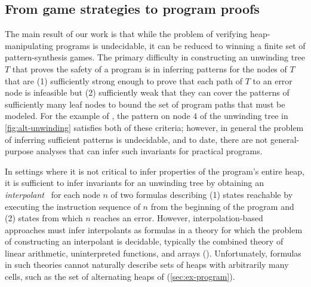 \subsection{From game strategies to program proofs}
\label{sec:ex-infer}
%
The main result of our work is that while the problem of verifying
heap-manipulating programs is undecidable, it can be reduced to
winning a finite set of pattern-synthesis games.
%
The primary difficulty in constructing an unwinding tree $T$ that
proves the safety of a program is in inferring patterns for the nodes
of $T$ that are (1) sufficiently strong enough to prove that each path
of $T$ to an error node is infeasible but (2) sufficiently weak that
they can cover the patterns of sufficiently many leaf nodes to bound
the set of program paths that must be modeled.
%
For the example of \altlist, the pattern on node $4$ of the unwinding
tree in \autoref{fig:alt-unwinding} satisfies both of these criteria;
%
however, in general the problem of inferring sufficient patterns is
undecidable, and to date, there are not general-purpose analyses that
can infer such invariants for practical programs.

In settings where it is not critical to infer properties of the
program's entire heap, it is sufficient to infer invariants for an
unwinding tree by obtaining an \emph{interpolant}~\cite{mcmillan06}
for each node $n$ of two formulas describing (1) states reachable by
executing the instruction sequence of $n$ from the beginning of the
program and (2) states from which $n$ reaches an error.
%
However, interpolation-based approaches must infer interpolants as
formulas in a theory for which the problem of constructing an
interpolant is decidable, typically the combined theory of linear
arithmetic, uninterpreted functions, and arrays (\liufa).
%
Unfortunately, formulas in such theories cannot naturally describe
sets of heaps with arbitrarily many cells, such as the set of
alternating heaps of \altlist (\autoref{sec:ex-program}).

